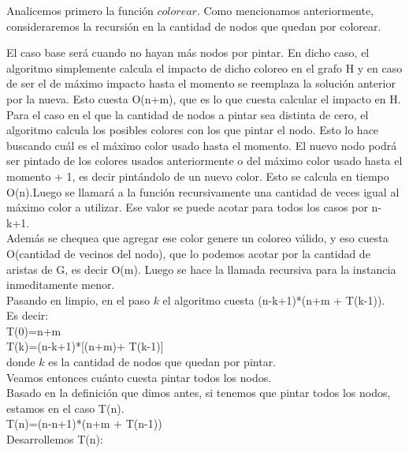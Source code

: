 \indent Analicemos primero la función $colorear$. Como mencionamos anteriormente, consideraremos la recursión en la cantidad de nodos que quedan por colorear.

\indent El caso base será cuando no hayan más nodos por pintar. En dicho caso, el algoritmo simplemente calcula el impacto de dicho coloreo en el grafo H y en caso de ser el de máximo impacto hasta el momento se reemplaza la solución anterior por la nueva. Esto cuesta O(n+m), que es lo que cuesta calcular el impacto en H.\\
\indent Para el caso en el que la cantidad de nodos a pintar sea distinta de cero, el algoritmo calcula los posibles colores con los que pintar el nodo. Esto lo hace buscando cuál es el máximo color usado hasta el momento. El nuevo nodo podrá ser pintado de los colores usados anteriormente o del máximo color usado hasta el momento + 1, es decir pintándolo de un nuevo color. Esto se calcula en tiempo O(n).Luego se llamará a la función recursivamente una cantidad de veces igual al máximo color a utilizar. Ese valor se puede acotar para todos los casos por n-k+1.\\
\indent Además se chequea que agregar ese color genere un coloreo válido, y eso cuesta O(cantidad de vecinos del nodo), que lo podemos acotar por la cantidad de aristas de G, es decir O(m). Luego se hace la llamada recursiva para la instancia inmeditamente menor.\\
\indent Pasando en limpio, en el paso $k$ el algoritmo cuesta (n-k+1)*(n+m + T(k-1)).\\
\indent Es decir:\\

\indent T(0)=n+m\\
\indent T(k)=(n-k+1)*[(n+m)+ T(k-1)]\\

donde $k$ es la cantidad de nodos que quedan por pintar.\\


\indent Veamos entonces cuánto cuesta pintar todos los nodos.\\
\indent Basado en la definición que dimos antes, si tenemos que pintar todos los nodos, estamos en el caso T(n).\\

\indent T(n)=(n-n+1)*(n+m + T(n-1))\\

\indent Desarrollemos T(n):\\


